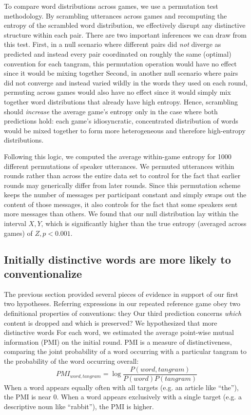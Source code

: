To compare word distributions across games, we use a permutation test methodology.
By scrambling utterances across games and recomputing the entropy of the scrambled word distribution, we effectively disrupt any distinctive structure within each pair.
There are two important inferences we can draw from this test.
First, in a null scenario where different pairs did \emph{not} diverge as predicted and instead every pair coordinated on roughly the same (optimal) convention for each tangram, this permutation operation would have no effect since it would be mixing together 
Second, in another null scenario where pairs did not converge and instead varied wildly in the words they used on each round, permuting across games would also have no effect since it would simply mix together word distributions that already have high entropy.
Hence, scrambling should \emph{increase} the average game's entropy only in the case where both predictions hold: each game's idiosyncratic, concentrated distribution of words would be mixed together to form more heterogeneous and therefore high-entropy distributions.

Following this logic, we computed the average within-game entropy for 1000 different permutations of speaker utterances. 
We permuted utterances within rounds rather than across the entire data set to control for the fact that earlier rounds may generically differ from later rounds. 
Since this permutation scheme keeps the number of messages per participant constant and simply swaps out the content of those messages, it also controls for the fact that some speakers sent more messages than others. 
We found that our null distribution lay within the interval $X, Y$, which is significantly higher than the true entropy (averaged across games) of $Z, p < 0.001$.

\subsection{Initially distinctive words are more likely to conventionalize}
\label{sec:distinctive}

The previous section provided several pieces of evidence in support of our first two hypotheses. 
Referring expressions in our repeated reference game obey two definitional properties of conventions: they 
Our third prediction concerns \emph{which} content is dropped and which is preserved? 
We hypothesized that more distinctive words 
For each word, we estimated the average point-wise mutual information (PMI) on the initial round. 
PMI is a measure of distinctiveness, comparing the joint probability of a word occurring with a particular tangram to the probability of the word occurring overall: 
$$PMI_{word, tangram} = \log\frac{P(word, tangram)}{P(word)P(tangram)}$$
When a word appears equally often with all targets (e.g. an article like ``the''), the PMI is near 0. 
When a word appears exclusively with a single target (e.g. a descriptive noun like ``rabbit''), the PMI is higher.

